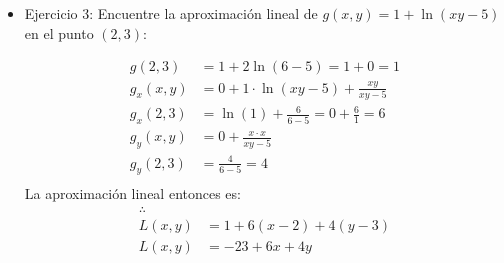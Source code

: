 \begin{itemize}
    \item Ejercicio 3: Encuentre la aproximación lineal de $g(x,y)=1+\ln (xy-5)$ en el punto $(2,3)$:
        \begin{center}
           \begin{align*}
               g(2,3)&=1+2 \ln (6-5) = 1+0 = 1 \\ 
               g_x(x,y) &= 0 + 1\cdot \ln (xy-5) + \frac{xy}{xy-5}  \\ 
               g_x(2,3) &= \ln (1) + \frac{6}{6-5} = 0 + \frac{6}{1} = 6 \\ 
               g_y(x,y) &= 0 + \frac{x\cdot x}{xy-5} \\ 
               g_y(2,3) &= \frac{4}{6-5} = 4 \\  
           \end{align*}
           La aproximación lineal entonces es:  
            \begin{align*}
                \therefore \\ 
                L(x,y) &= 1 + 6(x-2) + 4(y-3) \\ 
                L(x,y) &= -23 + 6x + 4y \\ 
            \end{align*}
        \end{center}
\end{itemize}



